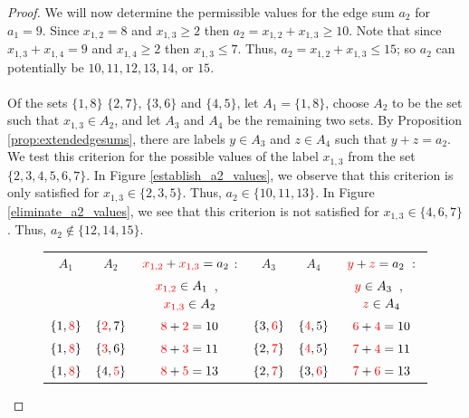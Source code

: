 \documentclass[10pt,a4paper]{amsart}
\begin{document}
\begin{proof}
We will now determine the permissible values for the edge sum $a_2$ for $a_1=9$. 
Since $x_{1,2}=8$ and $x_{1,3}\ge 2$ then $a_2=x_{1,2}+x_{1,3}\ge 10$. 
Note that since $x_{1,3}+x_{1,4}=9$ and $x_{1,4}\ge 2$ then $x_{1,3}\le 7$. 
Thus, $a_2=x_{1,2}+x_{1,3}\le 15$; so $a_2$ can potentially be $10, 11, 12, 13, 14$, or $15$.\\ 
\hspace{2in}\\
Of the sets $\{1,8\}$
$\{2,7\}$, $\{3,6\}$ and $\{4,5\}$,
let $A_1=\{1,8\}$, choose $A_2$ to be the set   
such that $x_{1,3}\in A_2$, and let $A_3$ and $A_4$ be the remaining two sets.
By Proposition \ref{prop:extendedgesums},
there are labels $y\in A_3$ and $z\in A_4$
such that $y+z=a_2$.
We test this criterion for the 
possible values of the label $x_{1,3}$ from
the set $\{2,3,4,5,6,7\}$.
In Figure  \ref{establish_a2_values}, we observe that
this criterion is only satisfied for $x_{1,3}\in \{2,3,5\}$.
Thus, $a_2\in\{10,11,13\}$. 
In Figure  \ref{eliminate_a2_values}, we see that 
this criterion is not satisfied for $x_{1,3}\in \{4,6,7\}$.
Thus, $a_2\not\in\{12,14,15\}$. 

\begin{figure}[hbt!]
    \centering
\renewcommand{\arraystretch}{1.5}
\begin{tabular}{|c|c|c|c|c|c|} \hline
$A_1$ & $A_2$  & $\textcolor{red}{x_{1,2}}+\textcolor{red}{x_{1,3}}=a_2$ : & $A_3$ &  $A_4$ & $\textcolor{red}{y}+\textcolor{red}{z} = a_2\ :$\\ 
      &            &   $\textcolor{red}{x_{1,2}}\in A_1$\ ,\ $\textcolor{red}{x_{1,3}}\in A_2$                                      &      &    &
$\textcolor{red}{y}\in A_3$\ ,\ $\textcolor{red}{z}\in A_4$ \\  \hline
$\{1, \textcolor{red}{8}\}$ & $\{\textcolor{red}{2}, 7\}$ & $\textcolor{red}{8}+\textcolor{red}{2}=10$ & $\{ 3,\textcolor{red}{6}\}$ &  $\{ \textcolor{red}{4}, 5  \}$ &  $\textcolor{red}{6}+\textcolor{red}{4}=10$\\  \hline
$\{1,\textcolor{red}{8}\}$ & $\{\textcolor{red}{3}, 6\}$ & $\textcolor{red}{8}+\textcolor{red}{3}=11$ & $\{ 2,\textcolor{red}{7}\}$ &  $\{ \textcolor{red}{4}, 5  \}$ &  $\textcolor{red}{7}+\textcolor{red}{4}=11$\\  \hline
$\{1, \textcolor{red}{8}\}$ & $\{4, \textcolor{red}{5}\}$ & $\textcolor{red}{8}+\textcolor{red}{5}=13$ & $\{ 2,\textcolor{red}{7}\}$ &  $\{ 3, \textcolor{red}{6}  \}$ &  $\textcolor{red}{7}+\textcolor{red}{6}=13$\\  \hline
\end{tabular}
    

\end{figure}
\end{proof}
\end{document}
